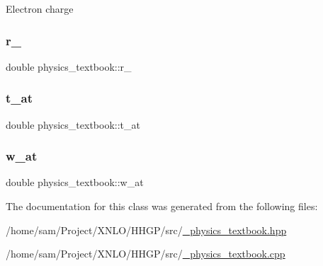 Electron charge \mbox{\label{classphysics__textbook_ac429976f0dc885d846d8b31c24f45bd6}} 
\subsubsection{\texorpdfstring{r\+\_}{r\_0}}
{\footnotesize\ttfamily double physics\+\_\+textbook\+::r\+\_}

\mbox{\label{classphysics__textbook_acdcf772ff70c544f8394b3a9fc57674c}} 
\subsubsection{\texorpdfstring{t\+\_\+at}{t\_at}}
{\footnotesize\ttfamily double physics\+\_\+textbook\+::t\+\_\+at}

\mbox{\label{classphysics__textbook_a63250c79f053fa4aa1c8f3505971b4f1}} 
\subsubsection{\texorpdfstring{w\+\_\+at}{w\_at}}
{\footnotesize\ttfamily double physics\+\_\+textbook\+::w\+\_\+at}



The documentation for this class was generated from the following files\+:\begin{DoxyCompactItemize}
\item 
/home/sam/\+Project/\+X\+N\+L\+O/\+H\+H\+G\+P/src/\hyperlink{__physics__textbook_8hpp}{\+\_\+physics\+\_\+textbook.\+hpp}\item 
/home/sam/\+Project/\+X\+N\+L\+O/\+H\+H\+G\+P/src/\hyperlink{__physics__textbook_8cpp}{\+\_\+physics\+\_\+textbook.\+cpp}\end{DoxyCompactItemize}
